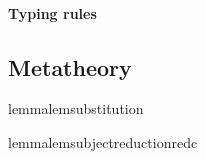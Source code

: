 \documentclass[main.tex]{subfiles}
\begin{document}

\paragraph{Typing rules}%
\label{sec:lvar-typing}



\subsection{Metatheory}

\begin{restatable}[Substitution]{lemma}{lemsubstitution}
  \label{lem:substitution}
\end{restatable}

\begin{restatable}{lemma}{lemsubjectreductionredc}
  \label{lem:subject-reduction-redc}
\end{restatable}
\end{document}
